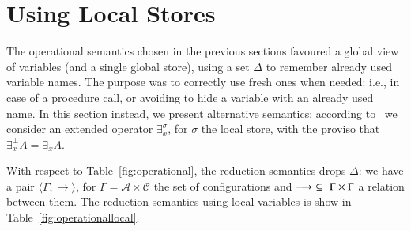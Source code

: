 \documentclass[main.tex]{subfiles}
\begin{document}
\section{Using Local Stores}\label{sec:localstores}

The operational semantics chosen in the previous sections favoured a global view of  variables (and a single global store), using a set $\Delta$ to remember already used variable names. The purpose was to correctly use fresh ones when needed: i.e., in case of a procedure call, or avoiding to hide a variable with an already used name. In this section instead, we present alternative semantics: according to~\cite{extendedHiding,fairness} we consider an extended operator $\exists_x^\sigma$, for $\sigma$ the local store, with the proviso that $\exists_x^\bot A = \exists_x A$.


With respect to Table~\ref{fig:operational}, the reduction semantics  drops $\Delta$:
we have a pair $\langle \Gamma,  \rightarrow \rangle$, for $\Gamma = {\mathcal A} \times {\mathcal C}$
the set of configurations  and $\longrightarrow \, \, \subseteq \, \,\Gamma \times   \Gamma$ a relation between
them. The reduction semantics using local variables is show in Table~\ref{fig:operationallocal}.
\end{document}
